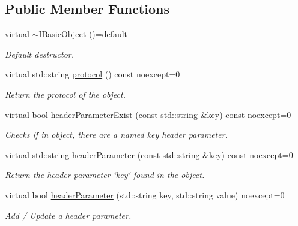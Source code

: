 \subsection*{Public Member Functions}
\begin{DoxyCompactItemize}
\item 
\mbox{\label{structhttp_1_1IBasicObject_ab605c64288bb38ef22741ee5ae1d1f41}} 
virtual \hyperlink{structhttp_1_1IBasicObject_ab605c64288bb38ef22741ee5ae1d1f41}{$\sim$\+I\+Basic\+Object} ()=default
\begin{DoxyCompactList}\small\item\em Default destructor. \end{DoxyCompactList}\item 
\mbox{\label{structhttp_1_1IBasicObject_a691aac60028d3b8785b80bfff286c51a}} 
virtual std\+::string \hyperlink{structhttp_1_1IBasicObject_a691aac60028d3b8785b80bfff286c51a}{protocol} () const noexcept=0
\begin{DoxyCompactList}\small\item\em Return the protocol of the object. \end{DoxyCompactList}\item 
virtual bool \hyperlink{structhttp_1_1IBasicObject_a581e48c03a666b87082c75427f0ff835}{header\+Parameter\+Exist} (const std\+::string \&key) const noexcept=0
\begin{DoxyCompactList}\small\item\em Checks if in object, there are a named \textquotesingle{}key\textquotesingle{} header parameter. \end{DoxyCompactList}\item 
virtual std\+::string \hyperlink{structhttp_1_1IBasicObject_a17f97dd4917fdd7dd694d3d191eaebca}{header\+Parameter} (const std\+::string \&key) const noexcept=0
\begin{DoxyCompactList}\small\item\em Return the header parameter \char`\"{}key\char`\"{} found in the object. \end{DoxyCompactList}\item 
virtual bool \hyperlink{structhttp_1_1IBasicObject_a0d1fff270c6069bedf87e86cdac6bf3d}{header\+Parameter} (std\+::string key, std\+::string value) noexcept=0
\begin{DoxyCompactList}\small\item\em Add / Update a header parameter. \end{DoxyCompactList}\item 

\end{DoxyCompactItemize}
